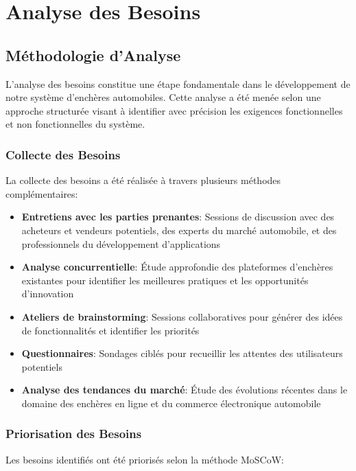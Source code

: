 \chapter{Analyse des Besoins}

\section{Méthodologie d'Analyse}

L'analyse des besoins constitue une étape fondamentale dans le développement de notre système d'enchères automobiles. Cette analyse a été menée selon une approche structurée visant à identifier avec précision les exigences fonctionnelles et non fonctionnelles du système.

\subsection{Collecte des Besoins}

La collecte des besoins a été réalisée à travers plusieurs méthodes complémentaires:

\begin{itemize}
    \item \textbf{Entretiens avec les parties prenantes}: Sessions de discussion avec des acheteurs et vendeurs potentiels, des experts du marché automobile, et des professionnels du développement d'applications
    \item \textbf{Analyse concurrentielle}: Étude approfondie des plateformes d'enchères existantes pour identifier les meilleures pratiques et les opportunités d'innovation
    \item \textbf{Ateliers de brainstorming}: Sessions collaboratives pour générer des idées de fonctionnalités et identifier les priorités
    \item \textbf{Questionnaires}: Sondages ciblés pour recueillir les attentes des utilisateurs potentiels
    \item \textbf{Analyse des tendances du marché}: Étude des évolutions récentes dans le domaine des enchères en ligne et du commerce électronique automobile
\end{itemize}

\subsection{Priorisation des Besoins}

Les besoins identifiés ont été priorisés selon la méthode MoSCoW:

